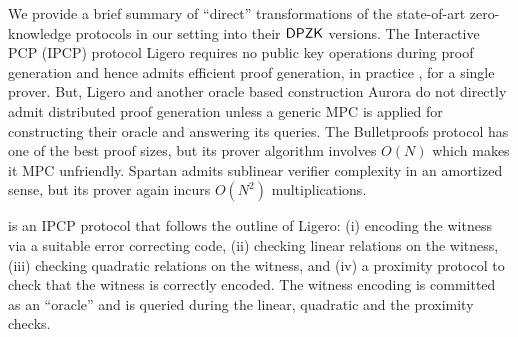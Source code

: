 
%
We provide a brief summary of ``direct'' transformations of the state-of-art zero-knowledge protocols in our setting into their $\mathsf{DPZK}$ versions.
The Interactive PCP (IPCP) protocol Ligero \cite{ligero} requires no public key operations during proof generation and hence admits efficient proof generation, in practice \cite{diogenes}, for a single prover. 
But, Ligero and another oracle based construction Aurora \cite{aurora} do not directly admit distributed proof generation unless a generic MPC is applied for constructing their oracle and answering its queries. The Bulletproofs protocol \cite{bulletproofs} has one of the best proof sizes, but its prover algorithm involves $O(N)$ which makes it MPC unfriendly. %
Spartan \cite{spartan} admits sublinear verifier complexity in an amortized sense, but its prover again incurs $O(N^2)$ multiplications.

\name{} is an IPCP protocol that follows the outline of Ligero: (i) encoding the witness via a suitable error correcting code, (ii) checking linear relations on the witness, (iii) checking quadratic relations on the witness, and (iv) a proximity protocol to check that the witness is correctly encoded. The witness encoding is committed as an ``oracle'' and is queried during the linear, quadratic and the proximity checks. 
